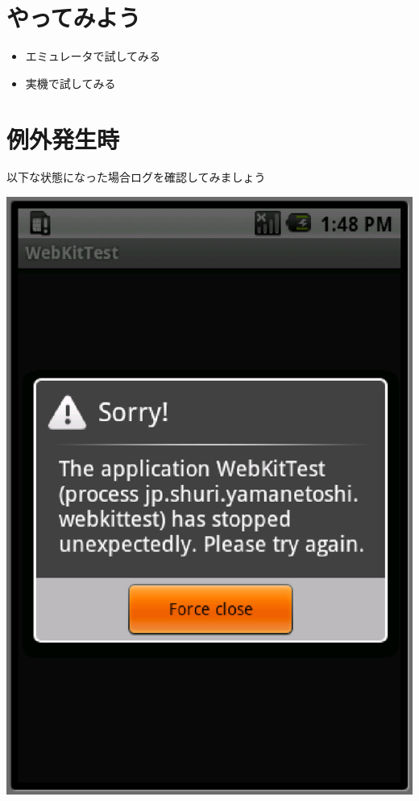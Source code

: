 \documentclass[slide,papersize]{jsarticle}
\begin{document}
\section*{やってみよう}
\bigskip
\begin{itemize}
\item エミュレータで試してみる
\bigskip
\item 実機で試してみる
\end{itemize}

\section*{例外発生時}
{\footnotesize 以下な状態になった場合ログを確認してみましょう}
\begin{center}
\includegraphics[scale=0.18]{nulpoexp.eps}
\end{center}
\end{document}
